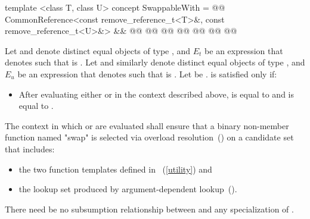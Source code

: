 %
\begin{itemdecl}
template <class T, class U>
concept SwappableWith =
  @@
  CommonReference<const remove_reference_t<T>&, const remove_reference_t<U>&> &&
  @@
  @@
    @@
    @@
    @@
    @@
  @\added{\};}@
\end{itemdecl}

{\color{remclr}
\begin{itemdescr}
\pnum
Let  and  denote distinct equal objects of type
, and $E_t$ be an expression that denotes 
such that  is .
Let  and  similarly denote distinct equal objects of type
, and $E_u$ be an expression that denotes 
such that  is . Let  be
.
 is satisfied only if:

\begin{itemize}
\item After evaluating either  or  in the
  context described above,  is equal to  and  is
  equal to .
\end{itemize}

\pnum
The context in which  or  are evaluated shall ensure that a binary non-member
function named "swap" is selected via overload resolution~() on a candidate set that includes:
\begin{itemize}
\item the two  function templates defined in ~(\ref{utility}) and
\item the lookup set produced by argument-dependent lookup~().
\end{itemize}

\pnum
There need be no subsumption relationship between  and
any specialization of .
\end{itemdescr}
} %

